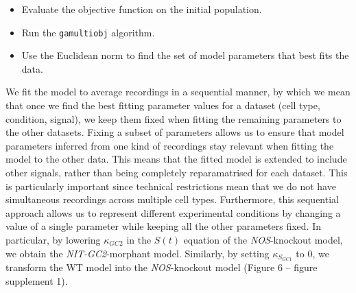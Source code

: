 \documentclass[
  11pt,
  letterpaper,
  DIV=11,
  numbers=noendperiod]{scrartcl}
\begin{document}
\begin{itemize}
  parameter values of
  \(\delta_{C_P}, \kappa_{UV}, \kappa_S, \delta_{B}, B_0\) from uniform
  distributions over the interval \({[}0,2{]}\). For \(\delta_S\) we use
  an interval \({[}0.2,2{]}\); we increase the lower bound to ensure
  that the \(S(t)\) returns quickly to a steady state after the end of
  the UV stimulation; without this restriction, good fits were obtained
  with the variable switching to a high value. For
  \(\kappa_{C_N}, \delta_{C_N}\) we use an interval \({[}0,2{]}\). For
  \(\kappa_{N,1}, \kappa_{N,2}, \delta_N\), we use an interval
  \({[}0,50{]}\). For \(\kappa_{S_GC1}\), \(\kappa_{N_{in,1}}\),
  \(\kappa_{S_1}\), \(\kappa_{S_2}\), \(\kappa_{+,1}\),
  \(\kappa_{+,2}\), \(\kappa_{+,3}\) we use an interval \({[}0,2{]}\).
  For \(\kappa_{GC1,1}\), \(\kappa_{GC1,2}\), \(\kappa_B\) we use an
  interval \({[}0,35{]}\). For \(\delta_{S_GC1}\),
  \(\delta_{N_{in,1}}\), \(\delta_{S_1}\), \(\delta_{S_2}\) we use an
  interval \({[}0.1,2{]}\); we increase the lower bounds to ensure that
  the variables return to steady states. For \(\kappa_{+,3}\) we use an
  interval \({[}0,0.0001{]}\); we fix the value of this parameter
  because the recordings for the longer stimulation times are not
  consistent with a model in which \(N_{in,2}^+\) variable starts to
  return to levels before UV stimulation. For \(\delta_{N_{in,2}}\) we
  use an interval \({[}0.2,2{]}\); we increase the lower bound to ensure
  that the variable returns to a steady state.
\item
  Evaluate the objective function on the initial population.
\item
  Run the \texttt{gamultiobj} algorithm.
\item
  Use the Euclidean norm to find the set of model parameters that best
  fits the data.
\end{itemize}

We fit the model to average recordings in a sequential manner, by which
we mean that once we find the best fitting parameter values for a
dataset (cell type, condition, signal), we keep them fixed when fitting
the remaining parameters to the other datasets. Fixing a subset of
parameters allows us to ensure that model parameters inferred from one
kind of recordings stay relevant when fitting the model to the other
data. This means that the fitted model is extended to include other
signals, rather than being completely reparamatrised for each dataset.
This is particularly important since technical restrictions mean that we
do not have simultaneous recordings across multiple cell types.
Furthermore, this sequential approach allows us to represent different
experimental conditions by changing a value of a single parameter while
keeping all the other parameters fixed. In particular, by lowering
\(\kappa_{GC2}\) in the \(S(t)\) equation of the \emph{NOS}-knockout
model, we obtain the \emph{NIT-GC2}-morphant model. Similarly, by
setting \(\kappa_{S_{GC1}}\) to 0, we transform the WT model into the
\emph{NOS}-knockout model (Figure 6 -- figure supplement 1).
\end{document}
